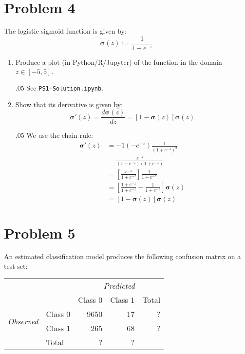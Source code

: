 \documentclass[11pt,twoside]{article}
\newcommand{\pts}[1]{\marginpar{ \small\hspace{0pt} \textit{[#1]} } }
\newcommand{\lt}{\left}
\newcommand{\rt}{\right}
\newcommand{\?}{\stackrel{?}{=}}
\newcommand{\fr}{\frac}
\newcommand{\bl}{\color{blue}}
\newenvironment{solution}{\begin{adjustwidth}{.05\textwidth}{}\bl}{\medskip\end{adjustwidth}}
\begin{document}
\section*{Problem 4 }
The logistic sigmoid function is given by:
\begin{equation}
  \bm\sigma(z) := \fr{1}{1 + e^{-z}}
\end{equation}

\begin{enumerate}[\bf(a)]
\item Produce a plot (in Python/R/Jupyter) of\pts{2} the function in the domain $z \in [-5,5]$.
  \begin{solution}
  \bl See \texttt{PS1-Solution.ipynb}.
\end{solution}
\item Show that its derivative is given by: \pts{4}
  \begin{equation}
    \bm\sigma'(z)  = \fr{d\bm\sigma(z)}{dz} = [1 - \bm\sigma(z)]\bm\sigma(z)
  \end{equation}
  \begin{solution}
  We use the chain rule:
  \begin{align*}
    \bm\sigma'(z) &= -1(-e^{-z}) \fr{1}{(1 + e^{-z})^{2}} \\
                  &= \fr{e^{-z}}{(1 + e^{-z})(1 + e^{-z})}\\
                  &= \lt[\fr{e^{-z}}{1 + e^{-z}}\rt]\fr{1}{1 + e^{-z}}\\
                  &= \lt[\fr{1 + e^{-z}}{1 + e^{-z}} - \fr{1}{1 + e^{-z}}\rt] \bm\sigma(z)\\
                  &= \lt[1 - \bm\sigma(z)\rt] \bm\sigma(z)
  \end{align*}
\end{solution}

\end{enumerate}

\eject
 \section*{Problem 5 }
An estimated classification model produces the following confusion matrix on a test set:

\begin{table}[h!]
  \centering \small
  \begin{tabular}{l l r r r}\toprule
    && \multicolumn{3}{c}{\it Predicted} \\
                                       &             & Class 0  & Class 1 & Total \\\midrule
    \multirow{2}{*}{\it Observed}& Class 0 & 9650 & 17 & ? \\
                                       & Class 1 &  265 & 68 & ? \\\midrule
    & Total & ? & ? & \\\bottomrule
  \end{tabular}
\end{table}
  
\end{document}
